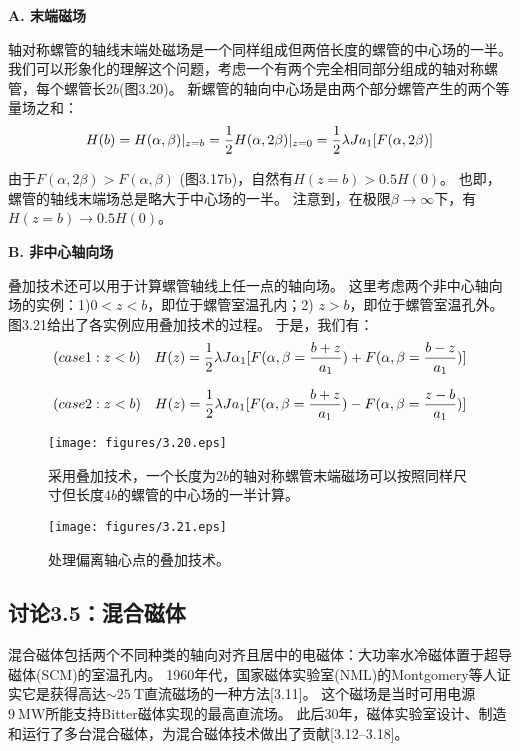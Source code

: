 \textbf{A. 末端磁场}

轴对称螺管的轴线末端处磁场是一个同样组成但两倍长度的螺管的中心场的一半。
我们可以形象化的理解这个问题，考虑一个有两个完全相同部分组成的轴对称螺管，每个螺管长$2b$(图3.20)。
新螺管的轴向中心场是由两个部分螺管产生的两个等量场之和：
\begin{equation}
H(b)=H(\alpha,\beta)|_{z=b}=\frac{1}{2}H(\alpha,2\beta)|_{z=0}=\frac{1}{2}\lambda Ja_{1}[F(\alpha,2\beta)]\\%
\end{equation}

由于$F(\alpha, 2\beta)>F(\alpha,\beta)$ (图3.17b)，自然有$H(z=b)>0.5H(0)$。
也即，螺管的轴线末端场总是略大于中心场的一半。
注意到，在极限$\beta\rightarrow\infty$下，有$H(z=b)\rightarrow 0.5H(0)$。

\textbf{B. 非中心轴向场}

叠加技术还可以用于计算螺管轴线上任一点的轴向场。
这里考虑两个非中心轴向场的实例：1)$0<z<b$，即位于螺管室温孔内；2) $z > b$，即位于螺管室温孔外。
图3.21给出了各实例应用叠加技术的过程。
于是，我们有：
\begin{equation}
(case 1:z<b)\quad H(z)=\frac{1}{2}\lambda J\alpha_{1}[F(\alpha,\beta=\frac{b+z}{a_{1}})+F(\alpha,\beta=\frac{b-z}{a_{1}})]\\%
\end{equation}

\begin{equation}
(case 2:z<b)\quad H(z)=\frac{1}{2}\lambda Ja_{1}[F(\alpha,\beta=\frac{b+z}{a_{1}})-F(\alpha,\beta=\frac{z-b}{a_{1}})]\\%
\end{equation}

\begin{figure}
	\centering
	\texttt{[image: figures/3.20.eps]}
	\caption{采用叠加技术，一个长度为$2b$的轴对称螺管末端磁场可以按照同样尺寸但长度$4b$的螺管的中心场的一半计算。}
\end{figure}

\begin{figure}
	\centering
	\texttt{[image: figures/3.21.eps]}
	\caption{处理偏离轴心点的叠加技术。}
\end{figure}

\newpage

\subsection{讨论3.5：混合磁体}
混合磁体包括两个不同种类的轴向对齐且居中的电磁体：大功率水冷磁体置于超导磁体(SCM)的室温孔内。
1960年代，国家磁体实验室(NML)的Montgomery等人证实它是获得高达$\sim 25\ \mathrm{T}$直流磁场的一种方法[3.11]。
这个磁场是当时可用电源$9\ \mathrm{MW}$所能支持Bitter磁体实现的最高直流场。
此后30年，磁体实验室设计、制造和运行了多台混合磁体，为混合磁体技术做出了贡献[3.12–3.18]。

